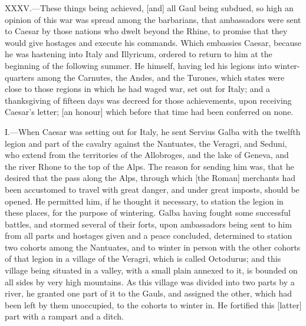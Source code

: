 XXXV.—These things being achieved, [and] all Gaul being subdued, so
high an opinion of this war was spread among the barbarians, that
ambassadors were sent to Caesar by those nations who dwelt beyond the
Rhine, to promise that they would give hostages and execute his
commands. Which embassies Caesar, because he was hastening into Italy
and Illyricum, ordered to return to him at the beginning of the
following summer. He himself, having led his legions into winter-quarters
among the Carnutes, the Andes, and the Turones, which states
were close to those regions in which he had waged war, set out for
Italy; and a thanksgiving of fifteen days was decreed for those
achievements, upon receiving Caesar's letter; [an honour] which before
that time had been conferred on none.


I.—When Caesar was setting out for Italy, he sent Servius Galba with
the twelfth legion and part of the cavalry against the Nantuates, the
Veragri, and Seduni, who extend from the territories of the Allobroges,
and the lake of Geneva, and the river Rhone to the top of the Alps. The
reason for sending him was, that he desired that the pass along the
Alps, through which [the Roman] merchants had been accustomed to travel
with great danger, and under great imposts, should be opened. He
permitted him, if he thought it necessary, to station the legion in
these places, for the purpose of wintering. Galba having fought some
successful battles, and stormed several of their forts, upon ambassadors
being sent to him from all parts and hostages given and a peace
concluded, determined to station two cohorts among the Nantuates, and to
winter in person with the other cohorts of that legion in a village of
the Veragri, which is called Octodurus; and this village being situated
in a valley, with a small plain annexed to it, is bounded on all sides
by very high mountains. As this village was divided into two parts by a
river, he granted one part of it to the Gauls, and assigned the other,
which had been left by them unoccupied, to the cohorts to winter in. He
fortified this [latter] part with a rampart and a ditch.

